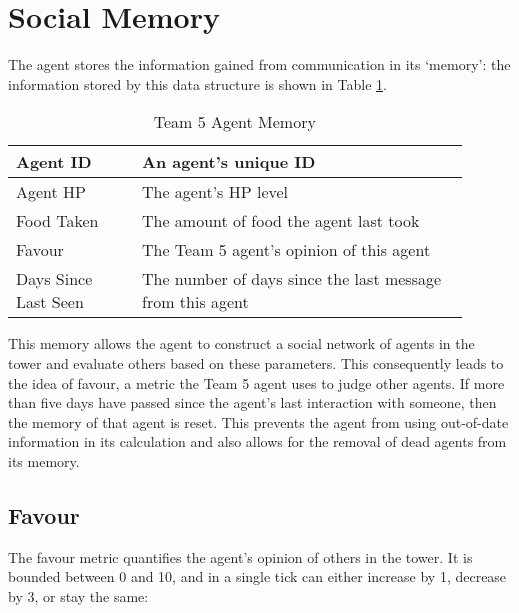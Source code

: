 \section{Social Memory}\label{sec:team5-memory}
The agent stores the information gained from communication in its `memory': the information stored by this data structure is shown in Table \ref{tab:team5-memory}.

\begin{table}
    \centering
    \begin{tabular}%
        {| >{\raggedleft\arraybackslash}p{0.25\linewidth} | %
        >{\raggedright\arraybackslash}p{0.65\linewidth} | %
        }
        \hline
        Agent ID & An agent's unique ID\\
        \hline
        Agent HP & The agent's HP level\\
        \hline
        Food Taken & The amount of food the agent last took\\
        \hline
        Favour & The Team 5 agent's opinion of this agent\\
        \hline
        Days Since Last Seen & The number of days since the last message from this agent\\
        \hline
    \end{tabular}
    \caption{Team 5 Agent Memory}
    \label{tab:team5-memory}
\end{table}

This memory allows the agent to construct a social network of agents in the tower and evaluate others based on these parameters. This consequently leads to the idea of favour, a metric the Team 5 agent uses to judge other agents. If more than five days have passed since the agent's last interaction with someone, then the memory of that agent is reset. This prevents the agent from using out-of-date information in its calculation and also allows for the removal of dead agents from its memory.

\subsection*{Favour}\label{sec:team5-favour}
The favour metric quantifies the agent's opinion of others in the tower. It is bounded between 0 and 10, and in a single tick can either increase by 1, decrease by 3, or stay the same:

